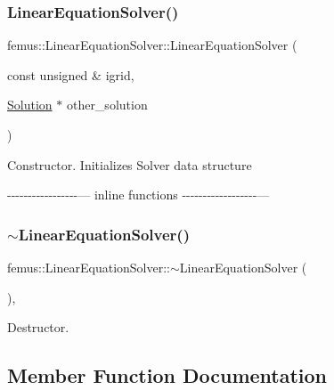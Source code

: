 \subsubsection{\texorpdfstring{Linear\+Equation\+Solver()}{LinearEquationSolver()}}
{\footnotesize\ttfamily femus\+::\+Linear\+Equation\+Solver\+::\+Linear\+Equation\+Solver (\begin{DoxyParamCaption}\item[{const unsigned \&}]{igrid,  }\item[{\mbox{\hyperlink{classfemus_1_1_solution}{Solution}} $\ast$}]{other\+\_\+solution }\end{DoxyParamCaption})\hspace{0.3cm}{\ttfamily [inline]}}

Constructor. Initializes Solver data structure

-\/-\/-\/-\/-\/-\/-\/-\/-\/-\/-\/-\/-\/-\/-\/-\/-\/--- inline functions -\/-\/-\/-\/-\/-\/-\/-\/-\/-\/-\/-\/-\/-\/-\/-\/-\/-\/--- \mbox{\label{classfemus_1_1_linear_equation_solver_aabf62de40b3bc08e5f900130ff341530}} 
\subsubsection{\texorpdfstring{$\sim$\+Linear\+Equation\+Solver()}{~LinearEquationSolver()}}
{\footnotesize\ttfamily femus\+::\+Linear\+Equation\+Solver\+::$\sim$\+Linear\+Equation\+Solver (\begin{DoxyParamCaption}{ }\end{DoxyParamCaption})\hspace{0.3cm}{\ttfamily [inline]}, {\ttfamily [virtual]}}

Destructor. 

\subsection{Member Function Documentation}
\mbox{\label{classfemus_1_1_linear_equation_solver_a6beb9feba179b5443d4cdd05e2fd46f4}} 

